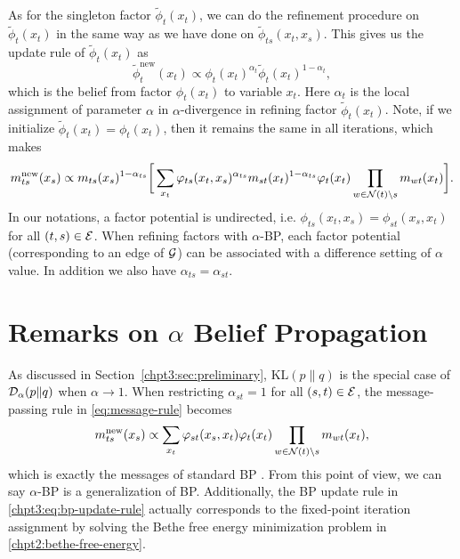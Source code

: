 As for the singleton factor $\tilde{\phi}_t(x_t)$, we can do the refinement procedure on $\tilde{\phi}_t(x_t)$ in the same way as we have done on $\tilde{\phi}_{ts}(x_t, x_s)$. This gives us the update rule of $\tilde{\phi}_t(x_t)$ as
\begin{equation}\label{eq:fix-factor-update}
  \tilde{\phi}_t^{\mathrm{new}}(x_t) \propto \phi_t(x_t)^{\alpha_{t}} \tilde{\phi}_t(x_t)^{1-\alpha_{t}},
\end{equation}
which is the belief from factor $\phi_t(x_t)$ to variable $x_t$. Here $\alpha_t$ is the local assignment of parameter $\alpha$ in $\alpha$-divergence in refining factor $\tilde{\phi}_t(x_t)$. Note, if
we initialize $\tilde{\phi}_t(x_t) = \phi_t(x_t)$, then it remains the
same in all iterations, which makes
\begin{align}\label{eq:message-rule}
  {m}^{\mathrm{new}}_{ts}(x_s) \propto
  m_{ts}(x_s)^{1-\alpha_{ts}} \bigg[\sum_{x_t} \varphi_{ts}(x_t, x_s)^{\alpha_{ts}} {m}_{st}(x_t)^{1-\alpha_{ts}} {\varphi}_t(x_t) \prod_{w\in \mathcal{N}(t)\backslash s}m_{wt}(x_t) \bigg].
\end{align}
In our notations, a factor potential is undirected, i.e. $\phi_{ts}(x_t, x_s)=\phi_{st}(x_s, x_t)$ for all $(t,s) \in \mathcal{E}$. When refining factors with $\alpha$-BP, each factor potential (corresponding to an edge of $\mathcal{G}$) can be associated with a difference setting of $\alpha$ value. In addition we also have $\alpha_{ts} = \alpha_{st}$.

\section{Remarks on $\alpha$ Belief Propagation}\label{subsec:remark}

As discussed in Section~\ref{chpt3:sec:preliminary}, $\mathrm{KL}(p\|q)$ is the special case of $\mathcal{D}_{\alpha}(p\|q)$ when $\alpha \rightarrow 1$. When restricting $\alpha_{st}=1$ for all $(s,t) \in \mathcal{E}$, the message-passing rule in \eqref{eq:message-rule} becomes
\begin{equation}\label{chpt3:eq:bp-update-rule}
  {m}^{\text{new}}_{ts}(x_s) \propto 
  \sum_{x_t} \varphi_{st}(x_s, x_t) {\varphi}_t(x_t) \prod_{w\in \mathcal{N}(t)\backslash s}m_{wt}(x_t),
\end{equation}
which is exactly the messages of standard BP \cite{Bishop:2006:PRM:1162264}. From this point of view, we can say $\alpha$-BP is a generalization of BP. Additionally, the BP update rule in \eqref{chpt3:eq:bp-update-rule} actually corresponds to the fixed-point iteration assignment by solving the Bethe free energy minimization problem in \eqref{chpt2:bethe-free-energy}.


